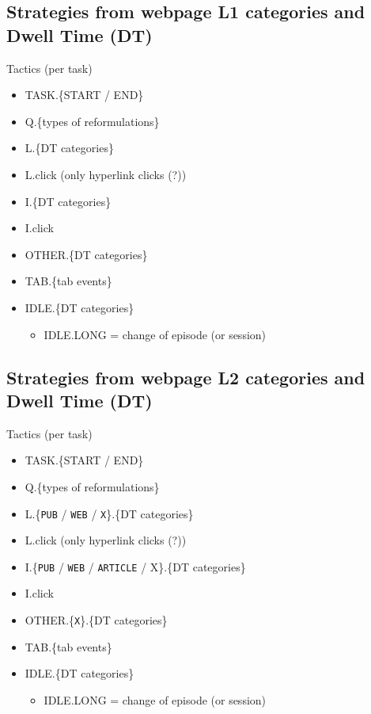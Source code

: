 \documentclass[letterpaper, nobind]{templates/ociamthesis}
\providecommand{\tightlist}{%
  \setlength{\itemsep}{0pt}\setlength{\parskip}{0pt}}
\begin{document}
\hypertarget{strategies-from-webpage-l1-categories-and-dwell-time-dt}{%
\subsection{Strategies from webpage L1 categories and Dwell Time (DT)}\label{strategies-from-webpage-l1-categories-and-dwell-time-dt}}

Tactics (per task)

\begin{itemize}
\tightlist
\item
  TASK.\{START / END\}
\item
  Q.\{types of reformulations\}
\item
  L.\{DT categories\}
\item
  L.click (only hyperlink clicks (?))
\item
  I.\{DT categories\}
\item
  I.click
\item
  OTHER.\{DT categories\}
\item
  TAB.\{tab events\}
\item
  IDLE.\{DT categories\}

  \begin{itemize}
  \tightlist
  \item
    IDLE.LONG = change of episode (or session)
  \end{itemize}
\end{itemize}

\hypertarget{strategies-from-webpage-l2-categories-and-dwell-time-dt}{%
\subsection{Strategies from webpage L2 categories and Dwell Time (DT)}\label{strategies-from-webpage-l2-categories-and-dwell-time-dt}}

Tactics (per task)

\begin{itemize}
\tightlist
\item
  TASK.\{START / END\}
\item
  Q.\{types of reformulations\}
\item
  L.\{\texttt{PUB} / \texttt{WEB} / \texttt{X}\}.\{DT categories\}
\item
  L.click (only hyperlink clicks (?))
\item
  I.\{\texttt{PUB} / \texttt{WEB} / \texttt{ARTICLE} / X\}.\{DT categories\}
\item
  I.click
\item
  OTHER.\{\texttt{X}\}.\{DT categories\}
\item
  TAB.\{tab events\}
\item
  IDLE.\{DT categories\}

  \begin{itemize}
  \tightlist
  \item
    IDLE.LONG = change of episode (or session)
  \end{itemize}
\end{itemize}
\end{document}
